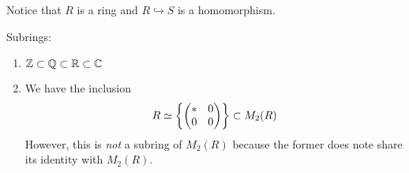 Notice that $R$ is a ring and $R \hookrightarrow S$ is a homomorphism. 

\begin{eg}
  Subrings:
  \begin{enumerate}
  \item $\mathbb{Z} \subset \mathbb{Q} \subset \mathbb{R} \subset \mathbb{C}$
  \item We have the inclusion
    \[
    R \simeq \left\{
      \begin{pmatrix}
        * & 0\\
        0 & 0
      \end{pmatrix}
    \right\}
    \subset M_2(R)
    \]
    However, this is \emph{not} a subring of $M_2(R)$ because the former does note share its identity with $M_2(R)$.
  \end{enumerate}
\end{eg}
